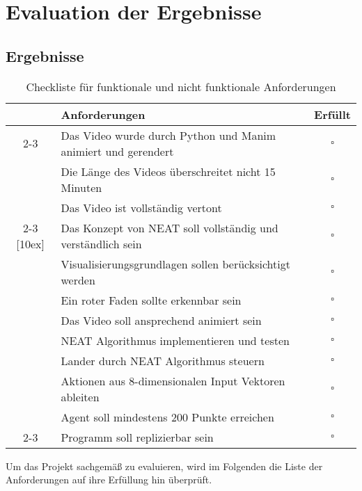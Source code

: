 \chapter{Evaluation der Ergebnisse}
\label{chapter:4}
\section{Ergebnisse}
\begin{table}[h]
	\centering
	\begin{tabularx}{\textwidth}{|c|X|c|}
		\hline
		\multirow{34}{*}[4ex]{\rotatebox[origin=c]{90}{\centering \textbf{Visualisierung}}} & \textbf{Anforderungen} & \textbf{Erfüllt} \\
		\cline{2-3}
		& Das Video wurde durch Python und Manim animiert und gerendert & $\square$ \\[4ex]
		& Die Länge des Videos überschreitet nicht 15 Minuten & $\square$ \\[4ex]
		& Das Video ist vollständig vertont & $\square$ \\[4ex]
		\cline{2-3}
		\multirow{44}{*}[10ex]{\rotatebox[origin=c]{90}{\centering \textbf{Implementierung}}} & Das Konzept von NEAT soll vollständig und verständlich sein & $\square$ \\[4ex]
		& Visualisierungsgrundlagen sollen berücksichtigt werden & $\square$ \\[4ex]
		& Ein roter Faden sollte erkennbar sein & $\square$ \\[4ex]
		& Das Video soll ansprechend animiert sein & $\square$ \\[4ex]
		\hline
		& NEAT Algorithmus implementieren und testen & $\square$ \\[4ex]
		& Lander durch NEAT Algorithmus steuern & $\square$ \\[4ex]
		& Aktionen aus 8-dimensionalen Input Vektoren ableiten & $\square$ \\[4ex]
		& Agent soll mindestens 200  Punkte erreichen & $\square$ \\[4ex]
		\cline{2-3}
		& Programm soll replizierbar sein & $\square$ \\[4ex]
		\hline
	\end{tabularx}
	\caption{Checkliste für funktionale und nicht funktionale Anforderungen}
\end{table}

Um das Projekt sachgemäß zu evaluieren, wird im Folgenden die Liste der Anforderungen auf ihre Erfüllung hin überprüft.

